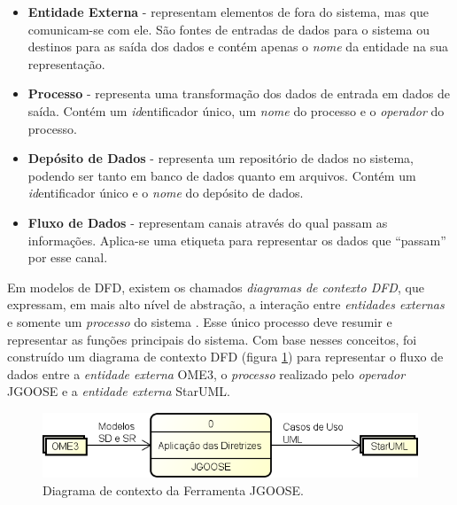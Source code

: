                 \begin{itemize}
                    \item \textbf{Entidade Externa}
                        - representam elementos de fora do sistema, mas que comunicam-se com ele.
                        São fontes de entradas de dados para o sistema ou destinos para as saída dos dados e contém apenas o \emph{nome} da entidade na sua representação.
                    \item \textbf{Processo} 
                        - representa uma transformação dos dados de entrada em dados de saída.
                        Contém um \emph{id}entificador único, um \emph{nome} do processo e o \emph{operador} do processo.
                    \item \textbf{Depósito de Dados}
                        - representa um repositório de dados no sistema, podendo ser tanto em banco de dados quanto em arquivos.
                        Contém um \emph{id}entificador único e o \emph{nome} do depósito de dados.
                    \item \textbf{Fluxo de Dados}
                        - representam canais através do qual passam as informações. Aplica-se uma etiqueta para representar os dados que ``passam'' por esse canal.
                \end{itemize}

                Em modelos de DFD, existem os chamados \emph{diagramas de contexto DFD}, que expressam, em mais alto nível de abstração, a interação entre \emph{entidades externas} e somente um \emph{processo} do sistema \cite{gane1977structured}. Esse único processo deve resumir e representar as funções principais do sistema.
                Com base nesses conceitos,
                    foi construído um diagrama de contexto DFD (figura \ref{fig:dfd-context}) para representar o fluxo de dados entre a \emph{entidade externa} OME3, o \emph{processo} realizado pelo \emph{operador} JGOOSE e a \emph{entidade externa} StarUML.
                
                    \begin{figure}[h!]
                        \centering
                            \includegraphics[scale=0.8]{Figuras/dfd-context-3.png}
                            \caption{Diagrama de contexto da Ferramenta JGOOSE.}
                            \label{fig:dfd-context}
                    \end{figure}

